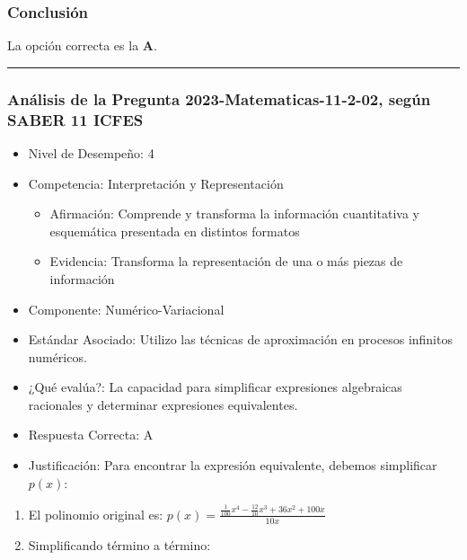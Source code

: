 \documentclass[
]{article}
\providecommand{\tightlist}{%
  \setlength{\itemsep}{0pt}\setlength{\parskip}{0pt}}
\begin{document}
\subsubsection{Conclusión}\label{conclusiuxf3n}

La opción correcta es la \textbf{A}.

\begin{center}\rule{0.5\linewidth}{0.5pt}\end{center}

\subsubsection{Análisis de la Pregunta 2023-Matematicas-11-2-02, según
SABER 11
ICFES}\label{anuxe1lisis-de-la-pregunta-2023-matematicas-11-2-02-seguxfan-saber-11-icfes}

\begin{itemize}
\tightlist
\item
  Nivel de Desempeño: 4
\item
  Competencia: Interpretación y Representación

  \begin{itemize}
  \tightlist
  \item
    Afirmación: Comprende y transforma la información cuantitativa y
    esquemática presentada en distintos formatos
  \item
    Evidencia: Transforma la representación de una o más piezas de
    información
  \end{itemize}
\item
  Componente: Numérico-Variacional
\item
  Estándar Asociado: Utilizo las técnicas de aproximación en procesos
  infinitos numéricos.
\item
  ¿Qué evalúa?: La capacidad para simplificar expresiones algebraicas
  racionales y determinar expresiones equivalentes.
\item
  Respuesta Correcta: A
\item
  Justificación: Para encontrar la expresión equivalente, debemos
  simplificar \(p(x)\):
\end{itemize}

\begin{enumerate}
\def\labelenumi{\arabic{enumi})}
\item
  El polinomio original es:
  \(p(x) = \frac{\frac{1}{100}x^4 - \frac{12}{10}x^3 + 36x^2 + 100x}{10x}\)
\item
  Simplificando término a término:
\end{enumerate}
\end{document}
